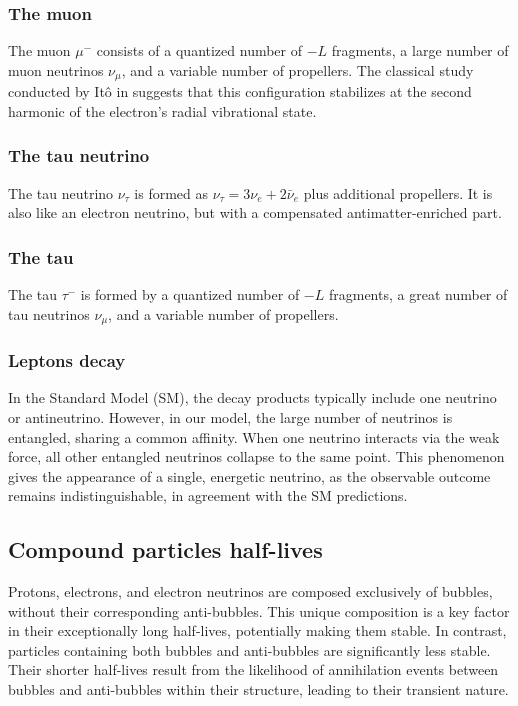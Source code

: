 \documentclass[12pt,english]{article}
\begin{document}
\subsubsection{The muon}  
The muon $\mu^-$ consists of a quantized number of $-L$ fragments, a large number of muon neutrinos $\nu_{\mu}$, and a variable number of propellers. The classical study conducted by Itô in \cite{ito} suggests that this configuration stabilizes at the second harmonic of the electron's radial vibrational state.

\subsubsection{The tau neutrino}
The tau neutrino $\nu_{\tau}$ is formed as $\nu_{\tau}=3\nu_e+2\bar{\nu}_e$ plus additional propellers. It is also like an electron neutrino, but with a compensated antimatter-enriched part.

\subsubsection{The tau}
The tau $\tau^-$ is formed by a quantized number of $-L$ fragments, a great number of tau neutrinos $\nu_{\mu}$, and a variable number of propellers.

\subsubsection{Leptons decay}
In the Standard Model (SM), the decay products typically include one neutrino or antineutrino. However, in our model, the large number of neutrinos is entangled, sharing a common affinity. When one neutrino interacts via the weak force, all other entangled neutrinos collapse to the same point. This phenomenon gives the appearance of a single, energetic neutrino, as the observable outcome remains indistinguishable, in agreement with the SM predictions.

\subsection{Compound particles half-lives}
Protons, electrons, and electron neutrinos are composed exclusively of bubbles, without their corresponding anti-bubbles. This unique composition is a key factor in their exceptionally long half-lives, potentially making them stable. In contrast, particles containing both bubbles and anti-bubbles are significantly less stable. Their shorter half-lives result from the likelihood of annihilation events between bubbles and anti-bubbles within their structure, leading to their transient nature.
\end{document}
